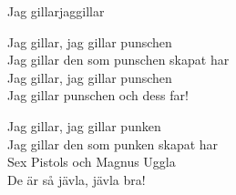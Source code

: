 \begin{song}{Jag gillar}{jaggillar}
\begin{vers}
Jag gillar, jag gillar punschen\\
Jag gillar den som punschen skapat har\\
Jag gillar, jag gillar punschen\\
Jag gillar punschen och dess far!\\
\end{vers}
\begin{vers}
Jag gillar, jag gillar punken\\
Jag gillar den som punken skapat har\\
Sex Pistols och Magnus Uggla\\
De är så jävla, jävla bra!
\end{vers}
\end{song}
